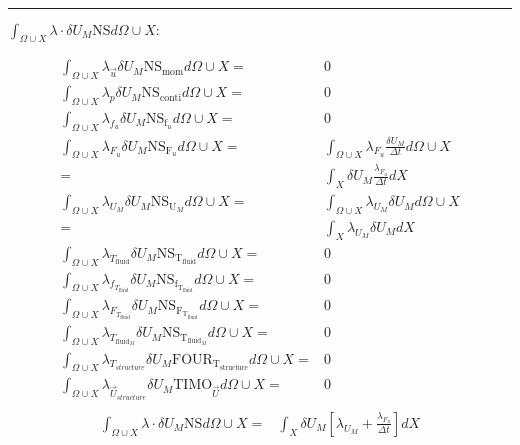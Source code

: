 \documentclass[10pt]{article} %
\begin{document}
\begin{center}
\begin{align*}
\end{align*}
\noindent\rule[1ex]{\textwidth}{1pt}
\begin{flushleft}
	$\int_{\Omega \cup X} \lambda \cdot \delta U_M \text{NS}d\Omega \cup X :$
\end{flushleft}
\begin{align*}
	\int_{\Omega \cup X} \lambda_{\vec{u}} \delta U_M \text{NS}_{\text{mom}} d\Omega \cup X =&  0\\
	\int_{\Omega \cup X} \lambda_p \delta U_M \text{NS}_{\text{conti}} d\Omega \cup X =& 0\\
	\int_{\Omega \cup X} \lambda_{f_u} \delta U_M \text{NS}_{\text{f}_u} d\Omega \cup X =& 0\\
	\int_{\Omega \cup X} \lambda_{F_u} \delta U_M \text{NS}_{\text{F}_u} d\Omega \cup X 
	=& \int_{\Omega \cup X}\lambda_{F_u} \frac{\delta U_M}{\Delta t} d\Omega \cup X\\
	=& \int_{X} \delta U_M  \frac{\lambda_{F_u}}{\Delta t} dX\\
	\int_{\Omega \cup X} \lambda_{U_M} \delta U_M \text{NS}_{\text{U}_M} d\Omega \cup X 
	=& \int_{\Omega \cup X} \lambda_{U_M} \delta U_M d\Omega \cup X\\
	=& \int_{X} \lambda_{U_M} \delta U_M d X\\
	\int_{\Omega \cup X} \lambda_{T_{\text{fluid}}} \delta U_M \text{NS}_{\text{T}_{\text{fluid}}} d\Omega \cup X =& 0\\
	\int_{\Omega \cup X} \lambda_{f_{T_{\text{fluid}}}} \delta U_M \text{NS}_{\text{f}_{\text{T}_{\text{fluid}}}} d\Omega \cup X =& 0\\
	\int_{\Omega \cup X} \lambda_{F_{T_{\text{fluid}}}} \delta U_M \text{NS}_{\text{F}_{\text{T}_{\text{fluid}}}} d\Omega \cup X =& 0\\
	\int_{\Omega \cup X} \lambda_{T_{\text{fluid}_M}} \delta U_M \text{NS}_{\text{T}_{\text{fluid}_M}} d\Omega \cup X =& 0\\
	\int_{\Omega \cup X} \lambda_{T_{structure}} \delta U_M \text{FOUR}_{\text{T}_{\text{structure}}} d\Omega \cup X =& 0\\
	\int_{\Omega \cup X} \lambda_{\vec{U}_{structure}} \delta U_M \text{TIMO}_{\vec{U}} d\Omega \cup X =& 0\\
\end{align*}
\begin{align*}
	\int_{\Omega \cup X} \lambda \cdot \delta U_M \text{NS}d\Omega \cup X 
	=&\int_{X} \delta U_M \left[ \lambda_{U_M} + \frac{\lambda_{F_u}}{\Delta t} \right] d X\\

\end{align*}
\end{center}
\end{document}
